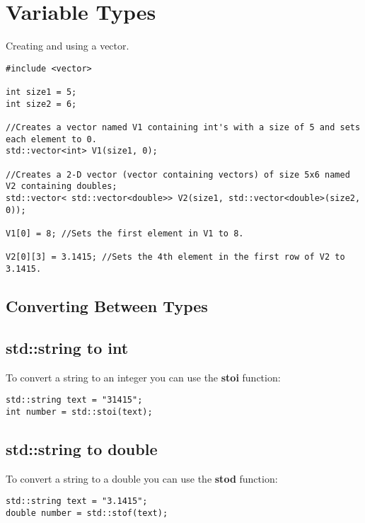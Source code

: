 \section{Variable Types}

Creating and using a vector.
\begin{lstlisting}
#include <vector>

int size1 = 5;
int size2 = 6;

//Creates a vector named V1 containing int's with a size of 5 and sets each element to 0. 
std::vector<int> V1(size1, 0); 

//Creates a 2-D vector (vector containing vectors) of size 5x6 named V2 containing doubles;
std::vector< std::vector<double>> V2(size1, std::vector<double>(size2, 0)); 

V1[0] = 8; //Sets the first element in V1 to 8.

V2[0][3] = 3.1415; //Sets the 4th element in the first row of V2 to 3.1415.

\end{lstlisting}













\subsection{Converting Between Types}

\subsection*{std::string to int}
To convert a string to an integer you can use the \textbf{stoi} function:
\begin{lstlisting}
std::string text = "31415";
int number = std::stoi(text);
\end{lstlisting}

\subsection*{std::string to double}
To convert a string to a double you can use the \textbf{stod} function:
\begin{lstlisting}
std::string text = "3.1415";
double number = std::stof(text);
\end{lstlisting}

















